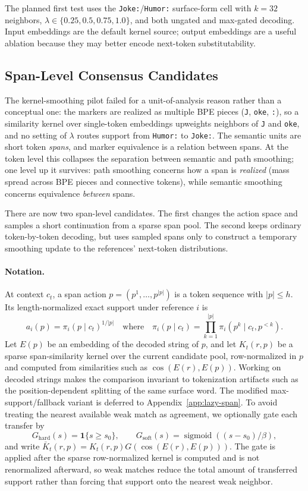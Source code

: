 \documentclass[11pt]{article}
\begin{document}
The planned first test uses the \texttt{Joke:}/\texttt{Humor:} surface-form cell with $k=32$ neighbors, $\lambda\in\{0.25,0.5,0.75,1.0\}$, and both ungated and max-gated decoding. Input embeddings are the default kernel source; output embeddings are a useful ablation because they may better encode next-token substitutability.

\subsection{Span-Level Consensus Candidates}
\label{sec:span-consensus}

The kernel-smoothing pilot failed for a unit-of-analysis reason rather than a conceptual one: the markers are realized as multiple BPE pieces (\texttt{J}, \texttt{oke}, \texttt{:}), so a similarity kernel over single-token embeddings upweights neighbors of \texttt{J} and \texttt{oke}, and no setting of $\lambda$ routes support from \texttt{Humor:} to \texttt{Joke:}. The semantic units are short token \emph{spans}, and marker equivalence is a relation between spans. At the token level this collapses the separation between semantic and path smoothing; one level up it survives: path smoothing concerns how a span is \emph{realized} (mass spread across BPE pieces and connective tokens), while semantic smoothing concerns equivalence \emph{between} spans.

There are now two span-level candidates. The first changes the action space and samples a short continuation from a sparse span pool. The second keeps ordinary token-by-token decoding, but uses sampled spans only to construct a temporary smoothing update to the references' next-token distributions.

\paragraph{Notation.} At context $c_t$, a span action $p=(p^1,\dots,p^{|p|})$ is a token sequence with $|p|\le h$. Its length-normalized exact support under reference $i$ is
\[
a_i(p)=\pi_i(p\mid c_t)^{1/|p|}
\quad\text{where}\quad
\pi_i(p\mid c_t)=\prod_{k=1}^{|p|}\pi_i(p^k\mid c_t,p^{<k}).
\]
Let $E(p)$ be an embedding of the decoded string of $p$, and let $K_t(r,p)$ be a sparse span-similarity kernel over the current candidate pool, row-normalized in $p$ and computed from similarities such as $\cos(E(r),E(p))$. Working on decoded strings makes the comparison invariant to tokenization artifacts such as the position-dependent splitting of the same surface word. The modified max-support/fallback variant is deferred to Appendix~\ref{app:lazy-span}.
To avoid treating the nearest available weak match as agreement, we optionally gate each transfer by
\[
G_{\mathrm{hard}}(s)=\mathbf{1}\{s\ge s_0\},
\qquad
G_{\mathrm{soft}}(s)=\operatorname{sigmoid}((s-s_0)/\beta),
\]
and write $\bar K_t(r,p)=K_t(r,p)G(\cos(E(r),E(p)))$. The gate is applied after the sparse row-normalized kernel is computed and is not renormalized afterward, so weak matches reduce the total amount of transferred support rather than forcing that support onto the nearest weak neighbor.
\end{document}
